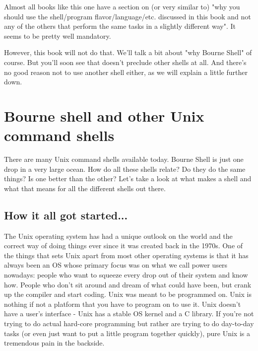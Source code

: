 Almost all books like this one have a section on (or very similar to) "why you
should use the shell/program flavor/language/etc. discussed in this book and
not any of the others that perform the same tasks in a slightly different way".
It seems to be pretty well mandatory.

However, this book will not do that. We'll talk a bit about "why Bourne Shell"
of course. But you'll soon see that doesn't preclude other shells at all. And
there's no good reason not to use another shell either, as we will explain a
little further down.

\section{Bourne shell and other Unix command shells}
There are many Unix command shells available today. Bourne Shell is just one
drop in a very large ocean. How do all these shells relate? Do they do the same
things? Is one better than the other? Let's take a look at what makes a shell
and what that means for all the different shells out there.

\subsection{How it all got started...}
The Unix operating system has had a unique outlook on the world and the correct
way of doing things ever since it was created back in the 1970s. One of the
things that sets Unix apart from most other operating systems is that it has
always been an OS whose primary focus was on what we call power users nowadays:
people who want to squeeze every drop out of their system and know how. People
who don't sit around and dream of what could have been, but crank up the
compiler and start coding. Unix was meant to be programmed on. Unix is nothing
if not a platform that you have to program on to use it. Unix doesn't have a
user's interface - Unix has a stable OS kernel and a C library. If you're not
trying to do actual hard-core programming but rather are trying to do
day-to-day tasks (or even just want to put a little program together quickly),
pure Unix is a tremendous pain in the backside.

